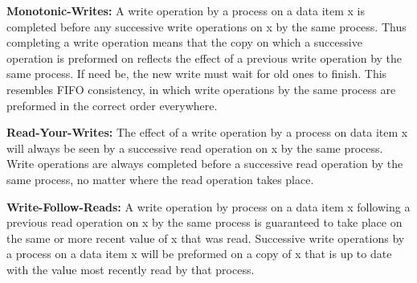 \documentclass[9pt]{extarticle} %
\begin{document}
\begin{minipage}[t]{.61\linewidth}
\textbf{Monotonic-Writes:} A write operation by a process on a data item x is completed before any successive write operations on x by the same process. Thus completing a write operation means that the copy on which a successive operation is preformed on reflects the effect of a previous write operation by the same process. If need be, the new write must wait for old ones to finish. This resembles FIFO consistency, in which write operations by the same process are preformed in the correct order everywhere. 

\textbf{Read-Your-Writes:} The effect of a write operation by a process on data item x will always be seen by a successive read operation on x by the same process. Write operations are always completed before a successive read operation by the same process, no matter where the read operation takes place. 

\textbf{Write-Follow-Reads:} A write operation by process on a data item x following a previous read operation on x by the same process is guaranteed to take place on the same or more recent value of x that was read. Successive write operations by a process on a data item x will be preformed on a copy of x that is up to date with the value most recently read by that process.


\end{minipage} %
\end{document}
